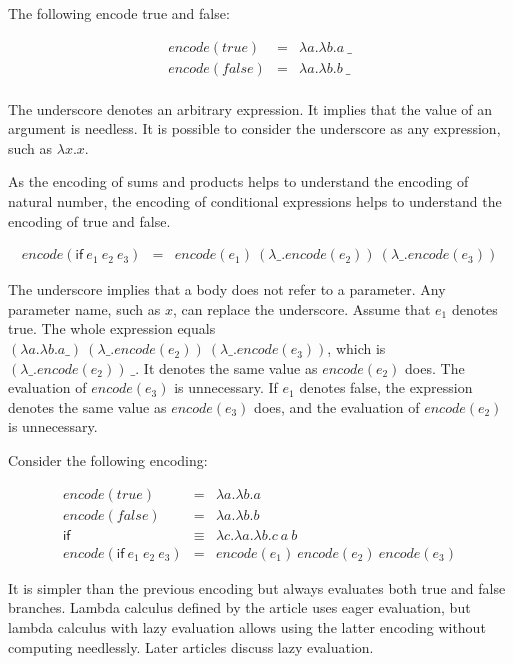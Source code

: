 The following encode true and false:

\[
\begin{array}{rcl}
\mathit{encode}(true)&=&\lambda a.\lambda b.a\ \_ \\
\mathit{encode}(false)&=&\lambda a.\lambda b.b\ \_ \\
\end{array}
\]

The underscore denotes an arbitrary expression. It implies that the value of an
argument is needless. It is possible to consider the underscore as any
expression, such as \(\lambda x.x\).

As the encoding of sums and products helps to understand the encoding of natural
number, the encoding of conditional expressions helps to understand the encoding
of true and false.

\[
\begin{array}{rcl}
\mathit{encode}(\textsf{if}\ e_1\ e_2\ e_3)&=&
\mathit{encode}(e_1)\ (\lambda\_ .\mathit{encode}(e_2))\ (\lambda\_
.\mathit{encode}(e_3))
\end{array}
\]

The underscore implies that a body does not refer to a parameter. Any parameter
name, such as \(x\), can replace the underscore. Assume that \(e_1\) denotes
true. The whole expression equals \( (\lambda a.\lambda b.a \_ )\ (\lambda\_
.\mathit{encode}(e_2))\ (\lambda\_ .\mathit{encode}(e_3))\), which is \(
(\lambda\_ .\mathit{encode}(e_2))\ \_ \). It denotes the same value as
\(\mathit{encode}(e_2)\) does. The evaluation of \(\mathit{encode}(e_3)\) is
unnecessary. If \(e_1\) denotes false, the expression denotes the same value as
\(\mathit{encode}(e_3)\) does, and the evaluation of \(\mathit{encode}(e_2)\) is
unnecessary.

Consider the following encoding:

\[
\begin{array}{rcl}
\mathit{encode}(true)&=&\lambda a.\lambda b.a \\
\mathit{encode}(false)&=&\lambda a.\lambda b.b \\
\textsf{if}&\equiv&\lambda c.\lambda a.\lambda b.c\ a\ b \\
\mathit{encode}(\textsf{if}\ e_1\ e_2\ e_3)&=&\mathit{encode}(e_1)\
\mathit{encode}(e_2)\ \mathit{encode}(e_3)
\end{array}
\]

It is simpler than the previous encoding but always evaluates both true and false
branches. Lambda calculus defined by the article uses eager evaluation, but
lambda calculus with lazy evaluation allows using the latter encoding without
computing needlessly. Later articles discuss lazy evaluation.

